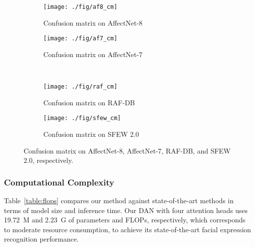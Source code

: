 \documentclass{article}
\begin{document}
\begin{figure}[]
    \begin{subfigure}[b]{0.485\textwidth}
        \centering
        \texttt{[image: ./fig/af8\_cm]}
        \captionsetup{justification=centering}
        \caption[]{{\small Confusion matrix on AffectNet-8}}    
        \label{fig:mean and std of net14}
    \end{subfigure}
    \begin{subfigure}[b]{0.485\textwidth}  
        \centering 
        \texttt{[image: ./fig/af7\_cm]}
        \captionsetup{justification=centering}
        \caption[]{{\small Confusion matrix on AffectNet-7}}    
        \label{fig:mean and std of net24}
    \end{subfigure}
  \vspace{6pt} \\
    \begin{subfigure}[b]{0.485\textwidth}   
        \centering 
        \texttt{[image: ./fig/raf\_cm]}
        \captionsetup{justification=centering}
        \caption[]{{\small Confusion matrix on RAF-DB}}    
        \label{fig:mean and std of net34}
    \end{subfigure}
    \begin{subfigure}[b]{0.485\textwidth}   
        \centering 
        \texttt{[image: ./fig/sfew\_cm]}
        \captionsetup{justification=centering}
        \caption[]{{\small Confusion matrix on SFEW 2.0}}    
        \label{fig:mean and std of net44}
    \end{subfigure} \vspace{6pt}
    \caption{ Confusion matrix on AffectNet-8, AffectNet-7, RAF-DB, and SFEW 2.0, respectively.} 
    \label{fig:cm}
\end{figure}

\subsubsection{Computational Complexity}
 Table~\ref{table:flops} compares our method against state-of-the-art methods in terms of model size and inference time. Our DAN with four attention heads uses 19.72~M and 2.23~G of parameters and FLOPs, respectively, which corresponds to moderate resource consumption, to achieve its state-of-the-art facial expression recognition performance.
\end{document}
